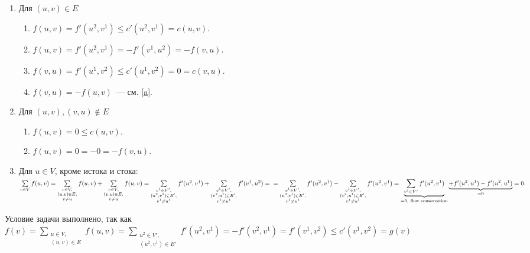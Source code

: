 \documentclass[a4paper]{article}
\begin{document}
\begin{enumerate}
\begin{enumerate}
\item Для $(u,v)\in E$
\begin{enumerate}
\item $f(u,v)=f'(u^2,v^1)\leqslant c'(u^2,v^1)=c(u,v)$.
\item \label{a} $f(u,v)=f'(u^2,v^1)=-f'(v^1,u^2)=-f(v,u)$.
\item $f(v,u)=f'(u^1,v^2)\leqslant c'(u^1,v^2)=0=c(v,u)$.
\item $f(v,u)=-f(u,v)$~--- см. \ref{a}.
\end{enumerate}
\item Для $(u,v), (v,u)\notin E$
\begin{enumerate}
\item $f(u,v)=0\leqslant c(u,v)$.
\item $f(u,v)=0=-0=-f(v,u)$.
\end{enumerate}
\item Для $u\in V$, кроме истока и стока:\newline
${\sum\limits_{v\in V}f(u,v)}={\sum\limits_{\substack{v\in V,\\ (u,v)\in E,\\v\neq u}}f(u,v)}+{\sum\limits_{\substack{v\in V,\\ (v,u)\in E,\\v\neq u}}f(u,v)}=
{\sum\limits_{\substack{v^1\in V',\\(u^2,v^1)\in E',\\v^1\neq u^1}}f'(u^2,v^1)}+{\sum\limits_{\substack{v^1\in V',\\(v^2,u^1)\in E',\\v^1\neq u^1}}f'(v^1,u^2)}=\newline
={\sum\limits_{\substack{v^1\in V',\\(u^2,v^1)\in E',\\v^1\neq u^1}}f'(u^2,v^1)}-{\sum\limits_{\substack{v^1\in V',\\(v^2,u^1)\in E',\\v^1\neq u^1}}f'(u^2,v^1)}=
\underbrace{\sum\limits_{v^1\in V'}f'(u^2,v^1)}_{=0,\ \text{flow\ conservation}}\underbrace{+f'(u^2,u^1)-f'(u^2,u^1)}_{=0}=0.$
\end{enumerate}
Условие задачи выполнено, так как\newline
$f(v)={\sum\limits_{\substack{u\in V,\\(u,v)\in E}}f(u,v)}={\sum\limits_{\substack{u^2\in V',\\(u^2,v^1)\in E'}}f'(u^2,v^1)}=-f'(v^2,v^1)=
f'(v^1,v^2)\leqslant c'(v^1,v^2)=g(v)$\newline

\end{enumerate}
\end{document}
